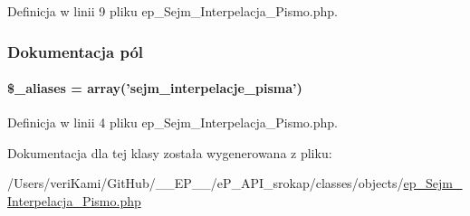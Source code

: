 Definicja w linii 9 pliku ep\-\_\-\-Sejm\-\_\-\-Interpelacja\-\_\-\-Pismo.\-php.



\subsubsection{Dokumentacja pól}
\hypertarget{classep___sejm___interpelacja___pismo_ab4e31d75f0bc5d512456911e5d01366b}{
\paragraph[{\$\-\_\-aliases}]{\setlength{\rightskip}{0pt plus 5cm}\$\-\_\-aliases = array('sejm\-\_\-interpelacje\-\_\-pisma')}}\label{classep___sejm___interpelacja___pismo_ab4e31d75f0bc5d512456911e5d01366b}


Definicja w linii 4 pliku ep\-\_\-\-Sejm\-\_\-\-Interpelacja\-\_\-\-Pismo.\-php.



Dokumentacja dla tej klasy została wygenerowana z pliku\-:\begin{DoxyCompactItemize}
\item 
/\-Users/veri\-Kami/\-Git\-Hub/\-\_\-\-\_\-\-E\-P\-\_\-\-\_\-/e\-P\-\_\-\-A\-P\-I\-\_\-srokap/classes/objects/\hyperlink{ep___sejm___interpelacja___pismo_8php}{ep\-\_\-\-Sejm\-\_\-\-Interpelacja\-\_\-\-Pismo.\-php}\end{DoxyCompactItemize}
